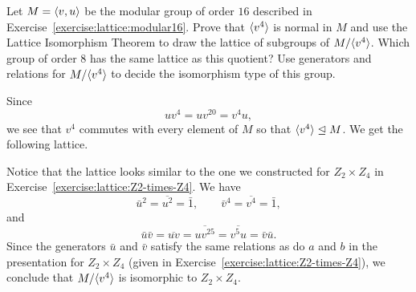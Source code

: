  Let $M = \langle{v,u}\rangle$ be the modular group of order $16$
described in Exercise~\ref{exercise:lattice:modular16}. Prove that
$\langle{v^4}\rangle$ is normal in $M$ and use the Lattice Isomorphism Theorem
to draw the lattice of subgroups of $M/\langle{v^4}\rangle$. Which group of
order $8$ has the same lattice as this quotient? Use generators and
relations for $M/\langle{v^4}\rangle$ to decide the isomorphism type of this
group.
\begin{solution}
  Since
  \begin{equation*}
    uv^4
    = uv^{20}
    = v^4u,
  \end{equation*}
  we see that $v^4$ commutes with every element of $M$ so that
  $\langle{v^4}\rangle\trianglelefteq M$. We get the following lattice.
  \begin{center}
  \end{center}

  Notice that the lattice looks similar to the one we constructed for
  $Z_2\times Z_4$ in Exercise~\ref{exercise:lattice:Z2-times-Z4}. We
  have
  \begin{equation*}
    \bar{u}^2 = \overline{u^2} = \bar1,
    \qquad
    \bar{v}^4 = \overline{v^4} = \bar1,
  \end{equation*}
  and
  \begin{equation*}
    \bar{u}\bar{v}
    = \overline{uv}
    = \overline{uv^{25}}
    = \overline{v^5u}
    = \bar{v}\bar{u}.
  \end{equation*}
  Since the generators $\bar{u}$ and $\bar{v}$ satisfy the same
  relations as do $a$ and $b$ in the presentation for $Z_2\times Z_4$
  (given in Exercise~\ref{exercise:lattice:Z2-times-Z4}), we conclude
  that $M/\langle{v^4}\rangle$ is isomorphic to $Z_2\times Z_4$.
\end{solution}
